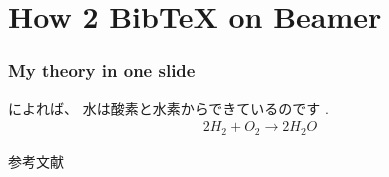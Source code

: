 \documentclass{beamer}  %
\begin{document}
\section{How 2 BibTeX on Beamer}
\begin{frame} \frametitle{My theory in one slide}
\cite{johnson2008notes}によれば、
水は酸素と水素からできているのです \cite{moczo2007finite}.
  \begin{eqnarray}
    2H_2 + O_2 \to 2H_2O
  \end{eqnarray}
\end{frame}

\begin{frame}[allowframebreaks]{参考文献}{}
  
  
\end{frame}
\end{document}

